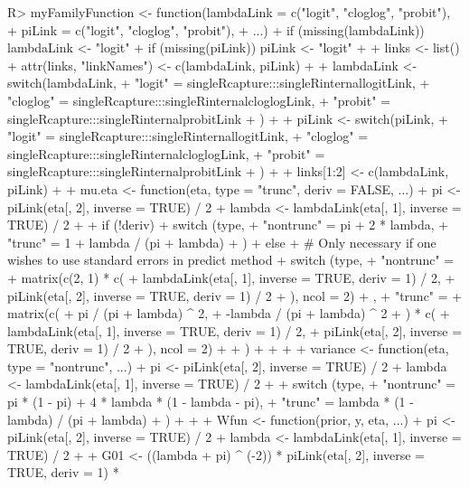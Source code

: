 \documentclass[nojss]{jss}
\newcommand{\1}{\mathcal{I}} \newcommand{\bZero}{\boldsymbol{0}}
\begin{document}
\small

\begin{CodeChunk}
\begin{CodeInput}
R> myFamilyFunction <- function(lambdaLink = c("logit", "cloglog", "probit"),
+                              piLink     = c("logit", "cloglog", "probit"),
+                              ...) {
+   if (missing(lambdaLink)) lambdaLink <- "logit"
+   if (missing(piLink))         piLink <- "logit"
+
+   links <- list()
+   attr(links, "linkNames") <- c(lambdaLink, piLink)
+
+   lambdaLink <- switch(lambdaLink,
+     "logit"   = singleRcapture:::singleRinternallogitLink,
+     "cloglog" = singleRcapture:::singleRinternalcloglogLink,
+     "probit"  = singleRcapture:::singleRinternalprobitLink
+   )
+
+   piLink <- switch(piLink,
+     "logit"   = singleRcapture:::singleRinternallogitLink,
+     "cloglog" = singleRcapture:::singleRinternalcloglogLink,
+     "probit"  = singleRcapture:::singleRinternalprobitLink
+   )
+
+   links[1:2] <- c(lambdaLink, piLink)
+
+   mu.eta <- function(eta, type = "trunc", deriv = FALSE, ...) {
+     pi     <-     piLink(eta[, 2], inverse = TRUE) / 2
+     lambda <- lambdaLink(eta[, 1], inverse = TRUE) / 2
+
+     if (!deriv) {
+       switch (type,
+         "nontrunc" = pi + 2 * lambda,
+         "trunc" = 1 + lambda / (pi + lambda)
+       )
+     } else {
+       # Only necessary if one wishes to use standard errors in predict method
+       switch (type,
+         "nontrunc" = {
+           matrix(c(2, 1) * c(
+             lambdaLink(eta[, 1], inverse = TRUE, deriv = 1) / 2,
+                 piLink(eta[, 2], inverse = TRUE, deriv = 1) / 2
+           ), ncol = 2)
+         },
+         "trunc" = {
+           matrix(c(
+             pi / (pi + lambda) ^ 2,
+             -lambda / (pi + lambda) ^ 2
+           ) * c(
+             lambdaLink(eta[, 1], inverse = TRUE, deriv = 1) / 2,
+                 piLink(eta[, 2], inverse = TRUE, deriv = 1) / 2
+           ), ncol = 2)
+         }
+       )
+     }
+   }
+
+   variance <- function(eta, type = "nontrunc", ...) {
+     pi     <-     piLink(eta[, 2], inverse = TRUE) / 2
+     lambda <- lambdaLink(eta[, 1], inverse = TRUE) / 2
+
+     switch (type,
+     "nontrunc" = pi * (1 - pi) + 4 * lambda * (1 - lambda - pi),
+     "trunc" = lambda * (1 - lambda) / (pi + lambda)
+     )
+   }
+
+   Wfun <- function(prior, y, eta, ...) {
+     pi     <-     piLink(eta[, 2], inverse = TRUE) / 2
+     lambda <- lambdaLink(eta[, 1], inverse = TRUE) / 2
+
+     G01 <- ((lambda + pi) ^ (-2)) * piLink(eta[, 2], inverse = TRUE, deriv = 1) *
}}
\end{CodeInput}
\end{CodeChunk}
\end{document}
